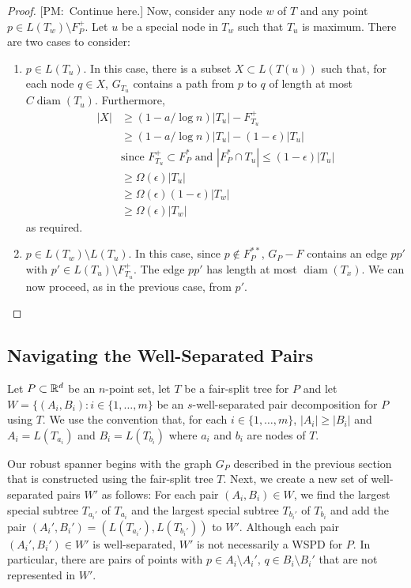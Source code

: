 \documentclass{patmorin}
\newcommand{\note}[2]{{\color{red}[#1:~#2]}}
\DeclareMathOperator{\diam}{diam}
\begin{document}
\begin{proof}
  \note{PM}{Continue here.}
  Now, consider any node $w$ of $T$ and any point $p\in L(T_w)\setminus
  F^+_P$.  Let $u$ be a special node in $T_w$ such that $T_u$ is maximum.
  There are two cases to consider:
  \begin{enumerate}
    \item $p\in L(T_u)$. In this case, there is a subset $X\subset L(T(u))$
     such that, for each node $q\in X$, $G_{T_u}$ contains a path from
     $p$ to $q$ of length at most $C\diam(T_u)$. Furthermore,
    \begin{align*}
      |X| & \ge (1-a/\log n)|T_u| - F^+_{T_u} \\
          & \ge (1-a/\log n)|T_u| - (1-\epsilon)|T_u| \\
             & \text{since $F^+_{T_u} \subset F^*_P$ and $|F^*_P\cap T_u|\le (1-\epsilon)|T_u|$} \\
         & \ge \Omega(\epsilon)|T_u| \\ 
         & \ge \Omega(\epsilon)(1-\epsilon)|T_w|  \\
         & \ge \Omega(\epsilon)|T_w| 
    \end{align*}
    as required.

    \item $p\in L(T_w)\setminus L(T_u)$.  In this case, since $p\not\in
    F^{**}_P$, $G_P-F$ contains an edge $pp'$ with $p'\in L(T_u)\setminus
    F^{+}_{T_u}$.  The edge $pp'$ has length at most $\diam(T_x)$.
    We can now proceed, as in the previous case, from $p'$.
  \end{enumerate}
\end{proof}


\subsection{Navigating the Well-Separated Pairs}

Let $P\subset\mathbb{R}^d$ be an $n$-point set, let $T$ be a fair-split tree for
$P$ and let $W=\{(A_i,B_i):i\in\{1,\ldots,m\}$ be an $s$-well-separated
pair decomposition for $P$ using $T$. We use the convention that,
for each $i\in\{1,\ldots,m\}$, $|A_i|\ge |B_i|$ and $A_i=L(T_{a_i})$
and $B_i=L(T_{b_i})$ where $a_i$ and $b_i$ are nodes of $T$.

Our robust spanner begins with the graph $G_P$ described in the previous
section that is constructed using the fair-split tree $T$.  Next,
we create a new set of well-separated pairs $W'$ as follows:  For each
pair $(A_i,B_i)\in W$, we find the largest special subtree $T_{a_i'}$
of $T_{a_i}$ and the largest special subtree $T_{b_i'}$ of $T_{b_i}$
and add the pair $(A_i',B_i')=(L(T_{a_i'}),L(T_{b_i'}))$ to $W'$.
Although each pair $(A_i',B_i')\in W'$ is well-separated, $W'$ is not
necessarily a WSPD for $P$.  In particular, there are pairs of points
with $p\in A_i\setminus A_i'$, $q\in B_i\setminus B_i'$ that are not
represented in $W'$.
\end{document}
